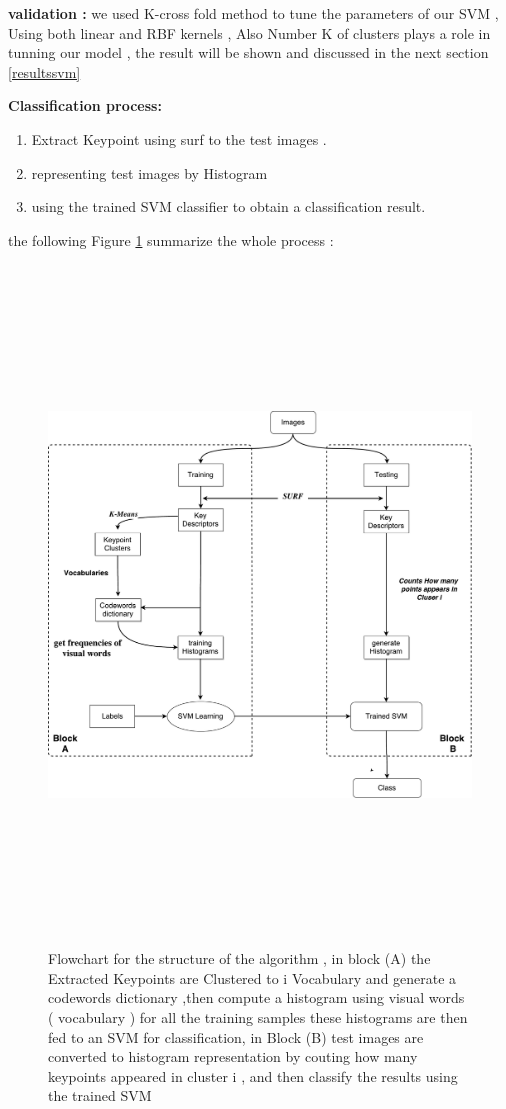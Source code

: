 \textbf{validation :}
we used K-cross fold method to tune the parameters of our SVM  , Using both linear and RBF kernels , Also Number K of clusters plays a role in tunning our model , the result will be shown and discussed in the next section \ref{resultssvm} 

\textbf{Classiﬁcation process: }
\begin{enumerate}
    \item Extract Keypoint using surf to the test images .
    \item  representing test images by Histogram
    \item using the trained SVM classiﬁer to obtain a classiﬁcation
result.
    
\end{enumerate}

the following Figure \ref{fig:algo1}  summarize the whole  process :

\begin{figure}[H]
\centering
\includegraphics[width=17cm, height=18cm ]{img/myalgo.pdf}
\caption{Flowchart for the structure of the algorithm , in block (A) the Extracted Keypoints  are Clustered to i Vocabulary and generate a codewords dictionary  ,then compute a histogram using visual words ( vocabulary ) for all the training samples these histograms are then fed to an SVM for classification, in Block (B) test images are converted to histogram representation by couting how many keypoints appeared in cluster i ,  and then classify the results using the trained SVM }
\label{fig:algo1}
\end{figure}


